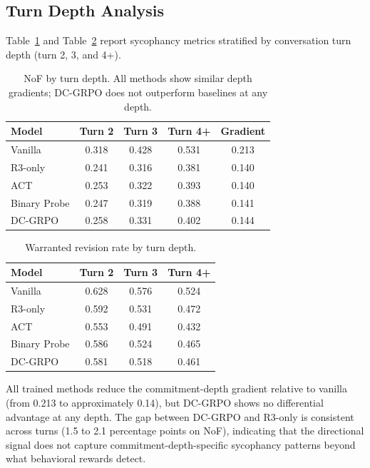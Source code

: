 \documentclass[11pt,a4paper]{article}
\begin{document}
\subsection{Turn Depth Analysis}
\label{sec:turndepth}

Table~\ref{tab:nof_depth} and Table~\ref{tab:wr_depth} report sycophancy metrics stratified by conversation turn depth (turn 2, 3, and 4+).

\begin{table}[h]
\centering
\caption{NoF by turn depth. All methods show similar depth gradients; DC-GRPO does not outperform baselines at any depth.}
\label{tab:nof_depth}
\small
\begin{tabular}{lcccc}
\toprule
Model & Turn 2 & Turn 3 & Turn 4+ & Gradient \\
\midrule
Vanilla      & 0.318 & 0.428 & 0.531 & 0.213 \\
R3-only      & 0.241 & 0.316 & 0.381 & 0.140 \\
ACT          & 0.253 & 0.322 & 0.393 & 0.140 \\
Binary Probe & 0.247 & 0.319 & 0.388 & 0.141 \\
DC-GRPO      & 0.258 & 0.331 & 0.402 & 0.144 \\
\bottomrule
\end{tabular}
\end{table}

\begin{table}[h]
\centering
\caption{Warranted revision rate by turn depth.}
\label{tab:wr_depth}
\small
\begin{tabular}{lccc}
\toprule
Model & Turn 2 & Turn 3 & Turn 4+ \\
\midrule
Vanilla      & 0.628 & 0.576 & 0.524 \\
R3-only      & 0.592 & 0.531 & 0.472 \\
ACT          & 0.553 & 0.491 & 0.432 \\
Binary Probe & 0.586 & 0.524 & 0.465 \\
DC-GRPO      & 0.581 & 0.518 & 0.461 \\
\bottomrule
\end{tabular}
\end{table}

All trained methods reduce the commitment-depth gradient relative to vanilla (from 0.213 to approximately 0.14), but DC-GRPO shows no differential advantage at any depth. The gap between DC-GRPO and R3-only is consistent across turns (1.5 to 2.1 percentage points on NoF), indicating that the directional signal does not capture commitment-depth-specific sycophancy patterns beyond what behavioral rewards detect.
\end{document}
